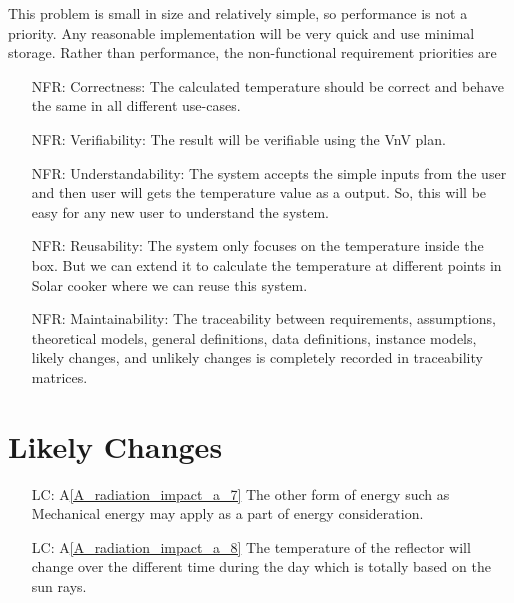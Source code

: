 \documentclass[12pt]{article}
\newcommand{\aref}[1]{A\ref{#1}}
\newcounter{nfrnum} %
\newcounter{lcnum} %
\begin{document}
This problem is small in size and relatively simple, so performance is not a priority. Any reasonable implementation will be very quick and use minimal storage. Rather than performance, the non-functional requirement priorities are 
\begin{itemize}

\item[NFR\refstepcounter{nfrnum}\thenfrnum \label{NFR_accuracy}:] Correctness: The calculated temperature should be correct and behave the same in all different use-cases.

\item[NFR\refstepcounter{nfrnum}\thenfrnum \label{NFR_accuracy}:] Verifiability: The result will be verifiable using the VnV plan.  

\item[NFR\refstepcounter{nfrnum}\thenfrnum \label{NFR_accuracy}:] Understandability: The system accepts the simple inputs from the user and then user will gets the temperature value as a output. So, this will be easy for any new user to understand the system. 

\item[NFR\refstepcounter{nfrnum}\thenfrnum \label{NFR_accuracy}:] Reusability: The system only focuses on the temperature inside the box. But we can extend it to calculate the temperature at different points in Solar cooker where we can reuse this system.  

\item[NFR\refstepcounter{nfrnum}\thenfrnum \label{NFR_accuracy}:] Maintainability: The traceability between requirements, assumptions, theoretical models, general definitions, data definitions, instance models,
likely changes, and unlikely changes is completely recorded in traceability matrices. 
 
\end{itemize}

\section{Likely Changes}    

\noindent \begin{itemize}

\item[LC\refstepcounter{lcnum}\thelcnum\label{LC_1}:] \aref{A_radiation_impact_a_7} 
The other form of energy such as Mechanical energy may apply as a part of energy consideration.

\item[LC\refstepcounter{lcnum}\thelcnum\label{LC_2}:] \aref{A_radiation_impact_a_8} 
The temperature of the reflector will change over the different time during the day which is totally based on the sun rays. 

\end{itemize}
\end{document}

